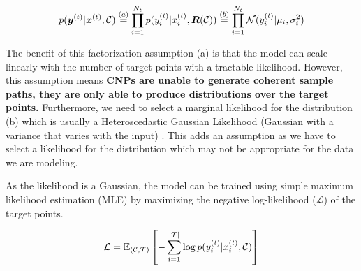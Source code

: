 \documentclass[../../main.tex]{subfiles}
\begin{document}
\begin{align}
    p(\bm{y}^{(t)} | \bm{x}^{(t)}, \mathcal{C}) &\stackrel{(a)}{=} \prod_{i=1}^{N_t} p({y}_i^{(t)} | {x}_i^{(t)}, \bm{R}(\mathcal{C}))  \stackrel{(b)}{=}
    \prod_{i=1}^{N_t} \mathcal{N}({y}_i^{(t)} | \mu_i, \sigma_i^2) \\
\end{align}

The benefit of this factorization assumption (a) is that the model can scale linearly with the number of target points with a tractable likelihood. However, this assumption means
\textbf{CNPs are unable to generate coherent sample paths, they are only able to produce distributions over the target points.} Furthermore, we need to select a marginal likelihood for the distribution (b) which is usually a Heteroscedastic Gaussian Likelihood (Gaussian with a variance that varies with the input) \cite{garnelo2018conditional}. This adds an assumption as we have to select a likelihood for the distribution which may not be appropriate for the data we are modeling.


As the likelihood is a Gaussian, the model can be trained using simple maximum likelihood estimation (MLE) by maximizing the negative log-likelihood ($\mathcal{L}$) of the target points.

\begin{equation}
    \mathcal{L} = \mathbb{E}_{(\mathcal{C}, \mathcal{T})} \left[- \sum_{i=1}^{|\mathcal{T}|} \log p({y}_i^{(t)} | {x}_i^{(t)}, \mathcal{C})\right]
\end{equation}



\end{document}
